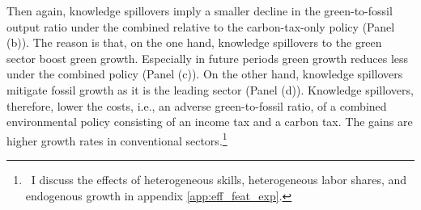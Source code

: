 
 
Then again, knowledge spillovers imply a smaller decline in the green-to-fossil output ratio under the combined relative to the carbon-tax-only policy (Panel (b)). The reason is that, on the one hand, knowledge spillovers to the green sector boost green growth. Especially in future periods green growth reduces less under the combined policy (Panel (c)). On the other hand, knowledge spillovers mitigate fossil growth as it is the leading sector (Panel (d)). %
 Knowledge spillovers, therefore, lower the costs, i.e., an adverse green-to-fossil ratio, of a combined environmental policy consisting of an income tax and a carbon tax. The gains are higher growth rates in conventional sectors.\footnote{\ 
 	I discuss the effects of heterogeneous skills, heterogeneous labor shares, and endogenous growth in appendix \ref{app:eff_feat_exp}. }
 
